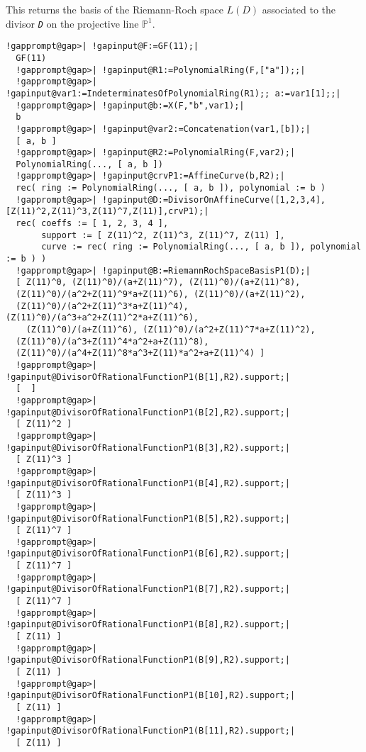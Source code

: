 \documentclass[a4paper,11pt]{report}
\begin{document}
{{{ This returns the basis of the Riemann-Roch space $L(D)$ associated to the divisor \mbox{\texttt{\mdseries\slshape D}} on the projective line ${\mathbb{P}}^1$. }

 
\begin{Verbatim}[commandchars=!@|,fontsize=\small,frame=single,label=Example]
  !gapprompt@gap>| !gapinput@F:=GF(11);|
  GF(11)
  !gapprompt@gap>| !gapinput@R1:=PolynomialRing(F,["a"]);;|
  !gapprompt@gap>| !gapinput@var1:=IndeterminatesOfPolynomialRing(R1);; a:=var1[1];;|
  !gapprompt@gap>| !gapinput@b:=X(F,"b",var1);|
  b
  !gapprompt@gap>| !gapinput@var2:=Concatenation(var1,[b]);|
  [ a, b ]
  !gapprompt@gap>| !gapinput@R2:=PolynomialRing(F,var2);|
  PolynomialRing(..., [ a, b ])
  !gapprompt@gap>| !gapinput@crvP1:=AffineCurve(b,R2);|
  rec( ring := PolynomialRing(..., [ a, b ]), polynomial := b )
  !gapprompt@gap>| !gapinput@D:=DivisorOnAffineCurve([1,2,3,4],[Z(11)^2,Z(11)^3,Z(11)^7,Z(11)],crvP1);|
  rec( coeffs := [ 1, 2, 3, 4 ], 
       support := [ Z(11)^2, Z(11)^3, Z(11)^7, Z(11) ], 
       curve := rec( ring := PolynomialRing(..., [ a, b ]), polynomial := b ) )
  !gapprompt@gap>| !gapinput@B:=RiemannRochSpaceBasisP1(D);|
  [ Z(11)^0, (Z(11)^0)/(a+Z(11)^7), (Z(11)^0)/(a+Z(11)^8), 
  (Z(11)^0)/(a^2+Z(11)^9*a+Z(11)^6), (Z(11)^0)/(a+Z(11)^2), 
  (Z(11)^0)/(a^2+Z(11)^3*a+Z(11)^4), (Z(11)^0)/(a^3+a^2+Z(11)^2*a+Z(11)^6),
    (Z(11)^0)/(a+Z(11)^6), (Z(11)^0)/(a^2+Z(11)^7*a+Z(11)^2), 
  (Z(11)^0)/(a^3+Z(11)^4*a^2+a+Z(11)^8), 
  (Z(11)^0)/(a^4+Z(11)^8*a^3+Z(11)*a^2+a+Z(11)^4) ]
  !gapprompt@gap>| !gapinput@DivisorOfRationalFunctionP1(B[1],R2).support;|
  [  ]
  !gapprompt@gap>| !gapinput@DivisorOfRationalFunctionP1(B[2],R2).support;|
  [ Z(11)^2 ]
  !gapprompt@gap>| !gapinput@DivisorOfRationalFunctionP1(B[3],R2).support;|
  [ Z(11)^3 ]
  !gapprompt@gap>| !gapinput@DivisorOfRationalFunctionP1(B[4],R2).support;|
  [ Z(11)^3 ]
  !gapprompt@gap>| !gapinput@DivisorOfRationalFunctionP1(B[5],R2).support;|
  [ Z(11)^7 ]
  !gapprompt@gap>| !gapinput@DivisorOfRationalFunctionP1(B[6],R2).support;|
  [ Z(11)^7 ]
  !gapprompt@gap>| !gapinput@DivisorOfRationalFunctionP1(B[7],R2).support;|
  [ Z(11)^7 ]
  !gapprompt@gap>| !gapinput@DivisorOfRationalFunctionP1(B[8],R2).support;|
  [ Z(11) ]
  !gapprompt@gap>| !gapinput@DivisorOfRationalFunctionP1(B[9],R2).support;|
  [ Z(11) ]
  !gapprompt@gap>| !gapinput@DivisorOfRationalFunctionP1(B[10],R2).support;|
  [ Z(11) ]
  !gapprompt@gap>| !gapinput@DivisorOfRationalFunctionP1(B[11],R2).support;|
  [ Z(11) ]
  
\end{Verbatim}
  

}}
\end{document}
